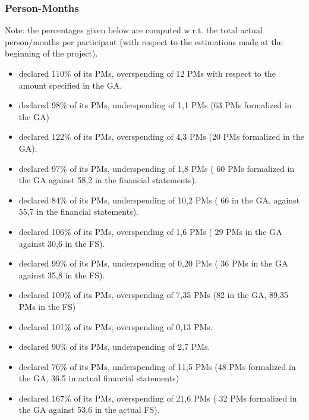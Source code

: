 \subsubsection{Person-Months}

Note: the percentages given below are computed w.r.t. the total actual
person/months per participant  (with respect to the estimations made 
at the beginning of the project).


\begin{itemize}
\item {} declared 110\% of its PMs, overspending of 12 PMs
with respect to the amount specified in the GA.
\item {} declared 98\% of its PMs, underspending of 1,1 PMs (63 PMs
  formalized in the GA)
\item {} declared 122\% of its PMs, overspending of 4,3 PMs (20 PMs
  formalized in the GA).
\item {} declared 97\% of its PMs, underspending of 1,8 PMs ( 60 PMs 
formalized in the GA against 58,2 in the financial statements).
\item {} declared 84\% of its PMs, underspending of 10,2 PMs ( 66 in the
 GA, against 55,7 in the financial statements).
\item {} declared 106\% of its PMs, overspending of 1,6 PMs ( 29 PMs 
in the GA against 30,6 in the FS).
\item {} declared 99\% of its PMs, underspending of 0,20 PMs ( 36 PMs 
in the GA against 35,8 in the FS).
\item {} declared 109\% of its PMs, overspending of 7,35 PMs (82 in the GA,
 89,35 PMs in the FS)
\item {} declared 101\% of its PMs, overspending of 0,13 PMs.
\item {} declared 90\% of its PMs, underspending of 2,7 PMs.
\item {} declared 76\% of its PMs, underspending of 11,5 PMs (48 PMs
formalized in the GA, 36,5 in actual financial statements)
\item {} declared 167\% of its PMs, overspending of 21,6 PMs ( 32 PMs
formalized in the GA against 53,6 in the actual FS).

\end{itemize}
